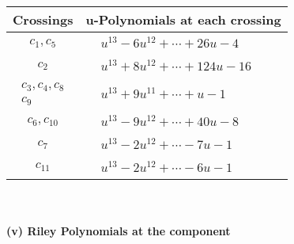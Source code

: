 \documentclass[1p]{elsarticle_modified}
\theoremstyle{definition}
\begin{document}
\begin{tabular}{m{50pt}|m{274pt}}
Crossings & \hspace{64pt}u-Polynomials at each crossing \\
\hline $$\begin{aligned}c_{1},c_{5}\end{aligned}$$&$\begin{aligned}
&u^{13}-6 u^{12}+\cdots+26 u-4
\end{aligned}$\\
\hline $$\begin{aligned}c_{2}\end{aligned}$$&$\begin{aligned}
&u^{13}+8 u^{12}+\cdots+124 u-16
\end{aligned}$\\
\hline $$\begin{aligned}c_{3},c_{4},c_{8}\\c_{9}\end{aligned}$$&$\begin{aligned}
&u^{13}+9 u^{11}+\cdots+u-1
\end{aligned}$\\
\hline $$\begin{aligned}c_{6},c_{10}\end{aligned}$$&$\begin{aligned}
&u^{13}-9 u^{12}+\cdots+40 u-8
\end{aligned}$\\
\hline $$\begin{aligned}c_{7}\end{aligned}$$&$\begin{aligned}
&u^{13}-2 u^{12}+\cdots-7 u-1
\end{aligned}$\\
\hline $$\begin{aligned}c_{11}\end{aligned}$$&$\begin{aligned}
&u^{13}-2 u^{12}+\cdots-6 u-1
\end{aligned}$\\
\hline
\end{tabular}\\~\\
\newpage\renewcommand{\arraystretch}{1}
\flushleft \textbf{(v) Riley Polynomials at the component}\newline \\
\end{document}
